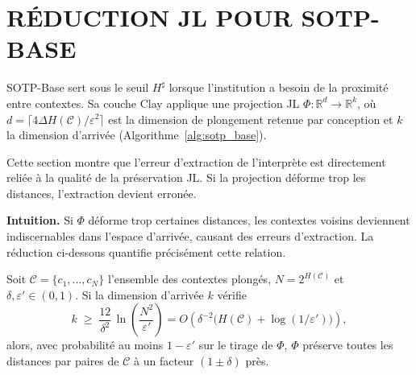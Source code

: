 \section{R\'EDUCTION JL POUR SOTP-BASE}
\label{sec:gamebased_SOTP-base}
\begin{sloppypar}
SOTP-Base sert sous le seuil $H^\sharp$ lorsque l'institution a besoin de la proximit\'e entre
contextes. Sa couche Clay applique une projection JL $\Phi\colon \mathbb{R}^d \to
\mathbb{R}^k$, o\`u $d = \lceil 4\Delta H(\mathcal{C})/\varepsilon^2 \rceil$ est la dimension de
plongement retenue par conception et $k$ la dimension d'arriv\'ee (Algorithme~\ref{alg:sotp_base}).

Cette section montre que l'erreur d'extraction de l'interpr\`ete est directement
reli\'ee \`a la qualit\'e de la pr\'eservation JL. Si la projection
d\'eforme trop les distances, l'extraction devient erron\'ee.

\noindent\textbf{Intuition.} Si $\Phi$ d\'eforme trop certaines distances,
les contextes voisins deviennent indiscernables dans l'espace d'arriv\'ee,
causant des erreurs d'extraction. La r\'eduction ci-dessous quantifie
pr\'ecis\'ement cette relation.

\begin{theorem}\label{thm:ann_sotp_base_opp}
Soit $\mathcal{C} = \{c_1,\ldots,c_N\}$ l'ensemble des contextes plong\'es, $N =
2^{H(\mathcal{C})}$ et $\delta, \varepsilon' \in (0,1)$. Si la dimension d'arriv\'ee
$k$ v\'erifie
\begin{equation}
k \;\geq\; \frac{12}{\delta^2}\,\ln\!\left(\frac{N^2}{\varepsilon'}\right)
= O\!\left(\delta^{-2}\bigl(H(\mathcal{C}) + \log(1/\varepsilon')\bigr)\right),
\end{equation}
alors, avec probabilit\'e au moins $1 - \varepsilon'$ sur le tirage de $\Phi$,
$\Phi$ pr\'eserve toutes les distances par paires de $\mathcal{C}$ \`a un facteur
$(1 \pm \delta)$ pr\`es.
\end{theorem}


\end{sloppypar}
